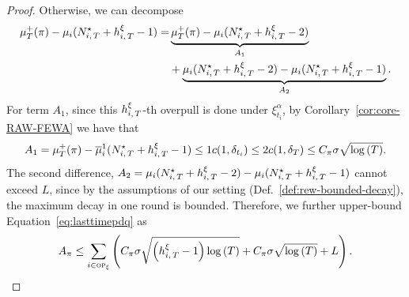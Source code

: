 \begin{proof}
Otherwise, we can decompose 
\begin{align*}
\mu^+_T(\pi) - \mu_i(\NiT^{\star} + \hiT^\xi - 1) %
= &\underbrace{\mu^+_T(\pi) - \mu_i(\NiT^{\star} + \hiT^\xi-2)}_{A_1} \\&+ 
\underbrace{\mu_i(\NiT^{\star} + \hiT^\xi-2) -  \mu_i(\NiT^{\star} + \hiT^\xi - 1)}_{A_2}.
\end{align*}
For term $A_1$, since this $h_{i,\,T}^\xi$-th overpull is done under $\xi^\alpha_{t_i}$, by Corollary~\ref{cor:core-RAW-FEWA} we have that
\[
A_1 = \mu^+_T(\pi) - \overline{\mu}_i^1(N_{i,\,T}^{\star} + h_{i,\,T}^\xi-1) \leq 1c(1, \delta_{t_i}) \leq 2c(1,\delta_{T}) \leq C_\pi \sigma \sqrt{\log\left(T\right)} .
\] 
The second difference, 
$A_2 = \mu_i(N_{i,\,T}^{\star} + h_{i,\,T}^\xi-2) -  \mu_i(N_{i,\,T}^{\star} + h_{i,\,T}^\xi - 1 )$  
cannot exceed $L$, since by the assumptions of our setting  (Def.~\ref{def:rew-bounded-decay}), the maximum decay in one round is bounded.
Therefore, we further upper-bound Equation~\ref{eq:lasttimepdq} as
\begin{align}
A_{\pi} \leq \sum_{i\in \textsc{op}_\xi} \left(C_\pi \sigma \sqrt{\left(h_{i,\,T}^\xi -1\right)\log\left(T\right)} + C_\pi \sigma\sqrt{\log{\left(T\right)}}+  L\right).
\label{HPevent0}
\end{align}
\end{proof}

\label{proof1}
\restaalgoindepub*
\label{proof2} 

